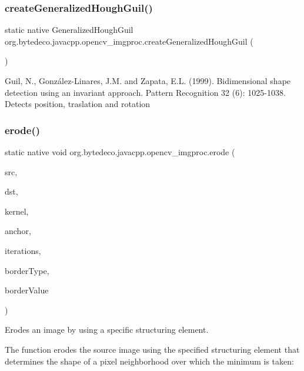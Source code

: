 \subsubsection{\texorpdfstring{create\+Generalized\+Hough\+Guil()}{createGeneralizedHoughGuil()}}
{\footnotesize\ttfamily static native Generalized\+Hough\+Guil org.\+bytedeco.\+javacpp.\+opencv\+\_\+imgproc.\+create\+Generalized\+Hough\+Guil (\begin{DoxyParamCaption}{ }\end{DoxyParamCaption})\hspace{0.3cm}{\ttfamily [static]}}

Guil, N., González-\/\+Linares, J.\+M. and Zapata, E.\+L. (1999). Bidimensional shape detection using an invariant approach. Pattern Recognition 32 (6)\+: 1025-\/1038. Detects position, traslation and rotation \mbox{\label{group__imgproc__filter_ga8c0cbcc8dd271aada560698924d19cb2}} 
\subsubsection{\texorpdfstring{erode()}{erode()}}
{\footnotesize\ttfamily static native void org.\+bytedeco.\+javacpp.\+opencv\+\_\+imgproc.\+erode (\begin{DoxyParamCaption}\item[{@By\+Val Mat}]{src,  }\item[{@By\+Val Mat}]{dst,  }\item[{@By\+Val Mat}]{kernel,  }\item[{@By\+Val(null\+Value=\char`\"{}cv\+::\+fr.antproject.utils.Point(-\/1,-\/1)\char`\"{}) fr.antproject.utils.Point}]{anchor,  }\item[{int}]{iterations,  }\item[{int}]{border\+Type,  }\item[{@Const @By\+Ref(null\+Value=\char`\"{}cv\+::\+Scalar(cv\+::morphology\+Default\+Border\+Value())\char`\"{}) Scalar}]{border\+Value }\end{DoxyParamCaption})\hspace{0.3cm}{\ttfamily [static]}}



Erodes an image by using a specific structuring element. 

The function erodes the source image using the specified structuring element that determines the shape of a pixel neighborhood over which the minimum is taken\+: 

